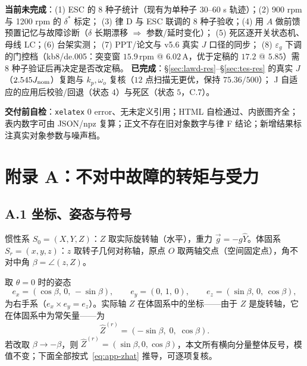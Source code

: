 \documentclass[11pt,a4paper]{article}
\theoremstyle{remark}\newtheorem{remark}{注}
\begin{document}
\noindent\textbf{当前未完成}：(1) ESC 的 8 种子统计（现有为单种子 30--60 s 轨迹）；(2) 900 rpm 与 1200 rpm 的 $\delta^{*}$ 标定；
(3) 律 D 与 ESC 联调的 8 种子验收；(4) 用 $A$ 做前馈预置记忆与故障诊断（$\delta$ 长期漂移 $\Rightarrow$ 参数/延时变化）；
(5) 死区逐开关状态机、母线 LC；(6) 台架实测；
(7) PPT/论文与 v5.6 真实 $J$ 口径的同步；
(8) $\varepsilon_g$ 下调的门控档（kb8/de.005：突变窗 $15.9$\,rpm @ $6.02$\,A，优于定稿的 $17.2$ @ $5.85$）需 8 种子验证后再决定是否改定稿。
\textbf{已完成}：§\ref{sec:lawd-res}--§\ref{sec:tes-res} 的真实 $J$（$2.545J_{\rm nom}$）复跑与 $k_p,\omega_o$ 复核（$12$ 点扫描无更优，保持 $75.36/500$）；
J 自适应的应用后校验/回退（状态 $4$）与死区（状态 $5$，C.7）。

\noindent\textbf{交付前自检}：\texttt{xelatex} 0 error、无未定义引用；HTML 自检通过、内嵌图齐全；
表内数字可由 JSON/npz 复算；正文不存在旧对象数字与律 F 结论；新增结果标注真实对象参数与噪声档。


\section*{附录 A：不对中故障的转矩与受力}\label{app:misalign}


\subsection*{A.1 坐标、姿态与符号}

惯性系 $S_0=(X,Y,Z)$：$Z$ 取实际旋转轴（水平），重力 $\vec g=-g\hat Y$。体固系 $S_r=(x,y,z)$：$z$ 取转子几何对称轴，原点 $O$ 取两轴交点（空间固定点），角不对中角 $\beta=\angle(z,Z)$。

取 $\theta=0$ 时的姿态
\begin{equation}
e_x=(\cos\beta,\,0,\,-\sin\beta),\qquad
e_y=(0,\,1,\,0),\qquad
e_z=(\sin\beta,\,0,\,\cos\beta),
\end{equation}
为右手系（$e_x\times e_y=e_z$）。实际轴 $Z$ 在体固系中的坐标——由于 $Z$ 是旋转轴，它在体固系中为常矢量——为
\begin{equation}
\hat Z^{(r)}=(-\sin\beta,\;0,\;\cos\beta).
\label{eq:app-zhat}
\end{equation}
若改取 $\beta\to-\beta$，则 $\hat Z^{(r)}=(\sin\beta,0,\cos\beta)$，本文所有横向分量整体反号，模值不变；下面全部按式~\eqref{eq:app-zhat} 推导，可逐项复核。
\end{document}
